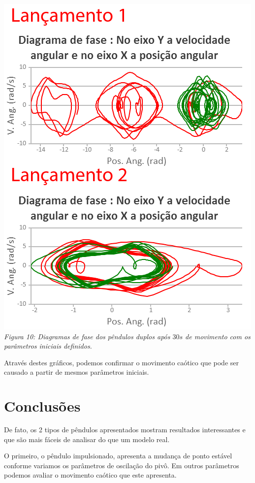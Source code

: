 \documentclass[13pt,a4paper]{report}
\begin{document}
\begin{center}
\includegraphics[scale=0.9]{figuras/figura10.png}
\\
\textit{Figura 10: Diagramas de fase dos pêndulos duplos após $30 s$ de movimento com os parâmetros iniciais definidos.}
\end{center}

Através destes gráficos, podemos confirmar o movimento caótico que pode ser causado a partir de mesmos parâmetros iniciais.
\clearpage

\chapter*{Conclusões}
De fato, os 2 tipos de pêndulos apresentados mostram resultados interessantes e que são mais fáceis de analisar do que um modelo real. 

O primeiro, o pêndulo impulsionado, apresenta a mudança de ponto estável conforme variamos os parâmetros de oscilação do pivô. Em outros parâmetros podemos avaliar o movimento caótico que este apresenta.
\end{document}
